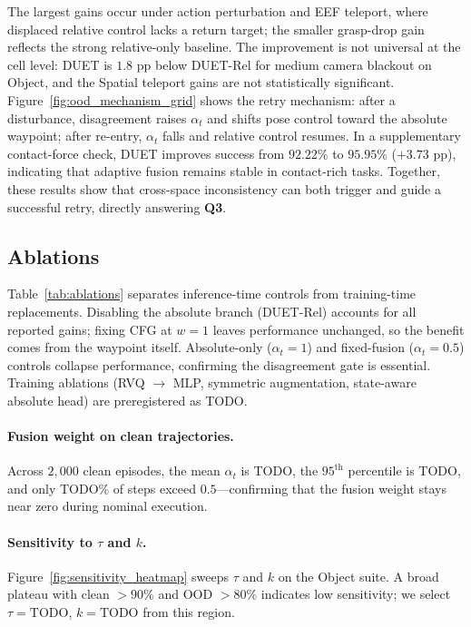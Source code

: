 \documentclass[letterpaper, 10 pt, conference]{ieeeconf}
\begin{document}
The largest gains occur under action perturbation and EEF teleport, where displaced relative control lacks a return target; the smaller grasp-drop gain reflects the strong relative-only baseline. The improvement is not universal at the cell level: DUET is $1.8$ pp below DUET-Rel for medium camera blackout on Object, and the Spatial teleport gains are not statistically significant. Figure~\ref{fig:ood_mechanism_grid} shows the retry mechanism: after a disturbance, disagreement raises $\alpha_t$ and shifts pose control toward the absolute waypoint; after re-entry, $\alpha_t$ falls and relative control resumes. In a supplementary contact-force check, DUET improves success from $92.22\%$ to $95.95\%$ ($+3.73$ pp), indicating that adaptive fusion remains stable in contact-rich tasks. Together, these results show that cross-space inconsistency can both trigger and guide a successful retry, directly answering \textbf{Q3}.

\subsection{Ablations}
\label{sec:ablations}
Table~\ref{tab:ablations} separates inference-time controls from training-time replacements. Disabling the absolute branch (DUET-Rel) accounts for all reported gains; fixing CFG at $w{=}1$ leaves performance unchanged, so the benefit comes from the waypoint itself. Absolute-only ($\alpha_t{=}1$) and fixed-fusion ($\alpha_t{=}0.5$) controls collapse performance, confirming the disagreement gate is essential. Training ablations (RVQ $\to$ MLP, symmetric augmentation, state-aware absolute head) are preregistered as TODO.

\paragraph{Fusion weight on clean trajectories.}
Across $2{,}000$ clean episodes, the mean $\alpha_t$ is TODO, the $95^{\mathrm{th}}$ percentile is TODO, and only TODO\% of steps exceed $0.5$---confirming that the fusion weight stays near zero during nominal execution.

\paragraph{Sensitivity to $\tau$ and $k$.}
Figure~\ref{fig:sensitivity_heatmap} sweeps $\tau$ and $k$ on the Object suite. A broad plateau with clean $>90\%$ and OOD $>80\%$ indicates low sensitivity; we select $\tau{=}\text{TODO}$, $k{=}\text{TODO}$ from this region.
\end{document}
